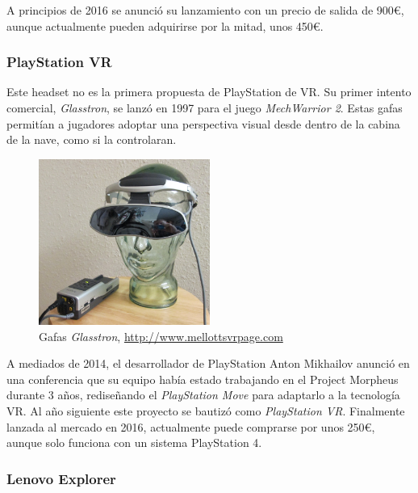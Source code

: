 A principios de 2016 se anunció su lanzamiento con un precio de salida de 900\euro, aunque actualmente pueden adquirirse por la mitad, unos 450\euro.

\subsubsection{PlayStation VR} 

Este headset no es la primera propuesta de PlayStation de \acs{VR}. Su primer intento comercial, \textit{Glasstron}, se lanzó en 1997 para el juego \textit{MechWarrior 2}. Estas gafas permitían a jugadores adoptar una perspectiva visual desde dentro de la cabina de la nave, como si la controlaran.

\vspace{0.1cm}

\begin{figure}[!h]
\begin{center}
\includegraphics[width=0.5\textwidth]{imagenes/2/glasstron.jpg}
\caption{Gafas \textit{Glasstron}, \url{http://www.mellottsvrpage.com}}
\label{fig:glasstron}
\end{center}
\end{figure}

A mediados de 2014, el desarrollador de PlayStation Anton Mikhailov anunció en una conferencia que su equipo había estado trabajando en el Project Morpheus durante 3 años, rediseñando el \textit{PlayStation Move} para adaptarlo a la tecnología \acs{VR}. Al año siguiente este proyecto se bautizó como \textit{PlayStation VR}. Finalmente lanzada al mercado en 2016, actualmente puede comprarse por unos 250\euro, aunque solo funciona con un sistema PlayStation 4.
    
\subsubsection{Lenovo Explorer} 

